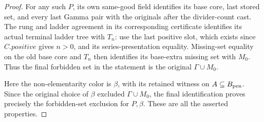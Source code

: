 \begin{proof}
For any such $P$, its own same-good field identifies its base core,
last stored set, and every last Gamma pair with the originals after the
divider-count cast. The rung and ladder agreement in its corresponding
certificate identifies its actual terminal ladder tree with $T_n$:
use the last positive slot, which exists since $C.\mathit{positive}$
gives $n>0$, and its series-presentation equality. Missing-set equality
on the old base core and $T_n$ then identifies its base-extra missing
set with $M_0$. Thus the final forbidden set in the statement is the
original $\Gamma\cup M_0$.

Here the non-elementarity color is $\beta$, with its retained witness
on $A\subseteq B_{\rm pen}$. Since the original choice of $\beta$
excluded $\Gamma\cup M_0$, the final identification proves precisely
the forbidden-set exclusion for $P,\beta$. These are all the asserted
properties.
\end{proof}
